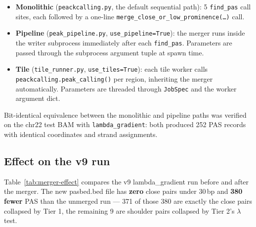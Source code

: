 \documentclass[11pt,a4paper]{article}
\begin{document}
\begin{itemize}
  \item \textbf{Monolithic} (\texttt{peackcalling.py}, the default sequential
        path): 5 \texttt{find\_pas} call sites, each followed by a one-line
        \texttt{merge\_close\_or\_low\_prominence(\ldots)} call.
  \item \textbf{Pipeline} (\texttt{peak\_pipeline.py},
        \texttt{use\_pipeline=True}): the merger runs inside the writer
        subprocess immediately after each \texttt{find\_pas}.  Parameters
        are passed through the subprocess argument tuple at spawn time.
  \item \textbf{Tile} (\texttt{tile\_runner.py}, \texttt{use\_tiles=True}):
        each tile worker calls \texttt{peackcalling.peak\_calling()} per
        region, inheriting the merger automatically.  Parameters are
        threaded through \texttt{JobSpec} and the worker argument dict.
\end{itemize}

Bit-identical equivalence between the monolithic and pipeline paths was
verified on the chr22 test BAM with \texttt{lambda\_gradient}: both produced
252 PAS records with identical coordinates and strand assignments.

\subsection{Effect on the v9 run}

Table~\ref{tab:merger-effect} compares the v9 lambda\_gradient run before and
after the merger.  The new pasbed.bed file has \textbf{zero} close pairs
under 30\,bp and \textbf{380 fewer} PAS than the unmerged run --- 371 of
those 380 are exactly the close pairs collapsed by Tier 1, the remaining
9 are shoulder pairs collapsed by Tier 2's $\lambda$ test.
\end{document}
